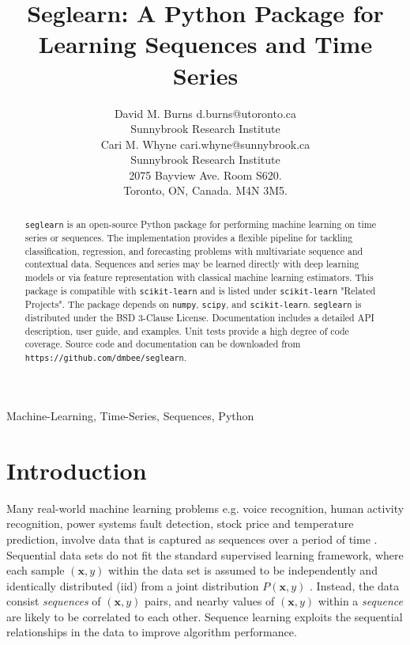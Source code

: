 \documentclass[twoside,11pt]{article}
\begin{document}
\title{Seglearn: A Python Package for Learning Sequences and Time Series}

\author{\name David M. Burns \email d.burns@utoronto.ca \\       
       \addr Sunnybrook Research Institute \\
       \AND
       \name Cari M. Whyne \email cari.whyne@sunnybrook.ca \\
       \addr Sunnybrook Research Institute \\
       2075 Bayview Ave. Room S620.\\
       Toronto, ON, Canada. M4N 3M5. \\ 
       }


\maketitle

\begin{abstract}%
\texttt{seglearn} is an open-source Python package for performing machine learning on time series or sequences. The implementation provides a flexible pipeline for tackling classification, regression, and forecasting problems with multivariate sequence and contextual data. Sequences and series may be learned directly with deep learning models or via feature representation with classical machine learning estimators. This package is compatible with \texttt{scikit-learn} and is listed under \texttt{scikit-learn} "Related Projects". The package depends on \texttt{numpy}, \texttt{scipy}, and \texttt{scikit-learn}. \texttt{seglearn} is distributed under the BSD 3-Clause License. Documentation includes a detailed API description, user guide, and examples. Unit tests provide a high degree of code coverage. Source code and documentation can be downloaded from \texttt{https://github.com/dmbee/seglearn}. 
\end{abstract}

\begin{keywords}
  Machine-Learning, Time-Series, Sequences, Python
\end{keywords}

\section{Introduction}

Many real-world machine learning problems e.g. voice recognition, human activity recognition, power systems fault detection, stock price and temperature prediction, involve data that is captured as sequences over a period of time \citep{aha_uci_2018}. Sequential data sets do not fit the standard supervised learning framework, where each sample $(\mathbf{x},y)$ within the data set is assumed to be independently and identically distributed (iid) from a joint distribution $P(\mathbf{x},y)$ \citep{bishop_pattern_2011}. Instead, the data consist \textit{sequences} of $(\mathbf{x},y)$ pairs, and nearby values of $(\mathbf{x},y)$ within a \textit{sequence} are likely to be correlated to each other. Sequence learning exploits the sequential relationships in the data to improve algorithm performance.
\end{document}

